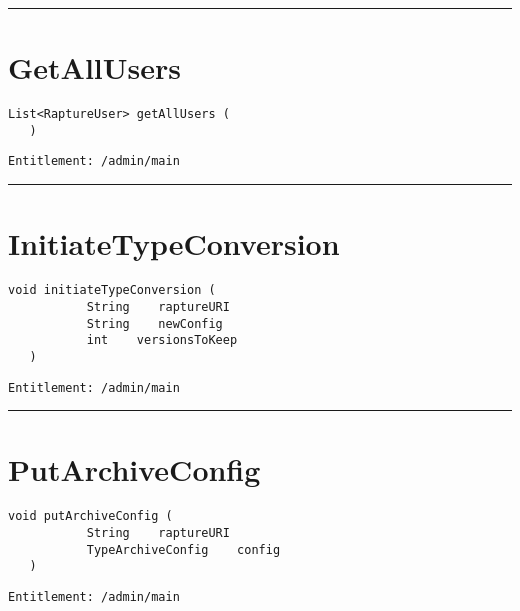 \rule{12cm}{2pt}
\section{GetAllUsers}
\label{Api:GetAllUsers}
\begin{lstlisting}[style=nonumbers]
   List<RaptureUser> getAllUsers (
   )
\end{lstlisting}
\begin{Verbatim}[formatcom=\color{Maroon}]
  Entitlement: /admin/main
\end{Verbatim}



\rule{12cm}{2pt}
\section{InitiateTypeConversion}
\label{Api:InitiateTypeConversion}
\begin{lstlisting}[style=nonumbers]
   void initiateTypeConversion (
           String    raptureURI
           String    newConfig
           int    versionsToKeep
   )
\end{lstlisting}
\begin{Verbatim}[formatcom=\color{Maroon}]
  Entitlement: /admin/main
\end{Verbatim}



\rule{12cm}{2pt}
\section{PutArchiveConfig}
\label{Api:PutArchiveConfig}
\begin{lstlisting}[style=nonumbers]
   void putArchiveConfig (
           String    raptureURI
           TypeArchiveConfig    config
   )
\end{lstlisting}
\begin{Verbatim}[formatcom=\color{Maroon}]
  Entitlement: /admin/main
\end{Verbatim}



